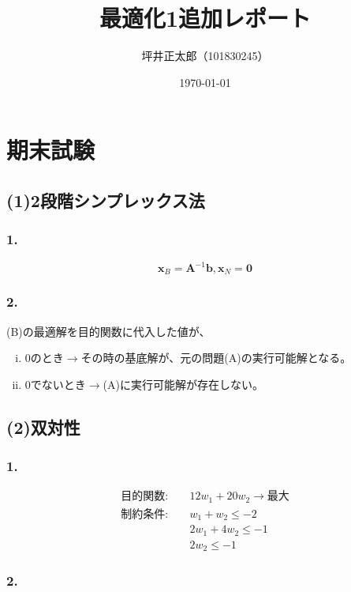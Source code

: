 \documentclass[a4paper,12pt]{jsarticle}
\begin{document}
\title{最適化1追加レポート}
\author{坪井正太郎（101830245）}
\date{\today}
\maketitle

\section{期末試験}

\subsection*{(1)2段階シンプレックス法}
\subsubsection*{1.}
\[\bm{x}_B=\bm{A}^{-1}\bm{b}, \bm{x}_N=\bm{0}\]

\subsubsection*{2.}
(B)の最適解を目的関数に代入した値が、
\begin{enumerate}[(i)]
  \item 0のとき$\rightarrow $その時の基底解が、元の問題(A)の実行可能解となる。
  \item 0でないとき$\rightarrow $(A)に実行可能解が存在しない。
\end{enumerate}

\subsection*{(2)双対性}
\subsubsection*{1.}
\begin{align*}
  目的関数:\quad & 12w_1 + 20w_2 \rightarrow 最大 \\
  制約条件:\quad & w_1 + w_2 \leq -2              \\
                 & 2w_1+4w_2\leq -1               \\
                 & 2w_2\leq -1
\end{align*}

\subsubsection*{2.}
\end{document}
